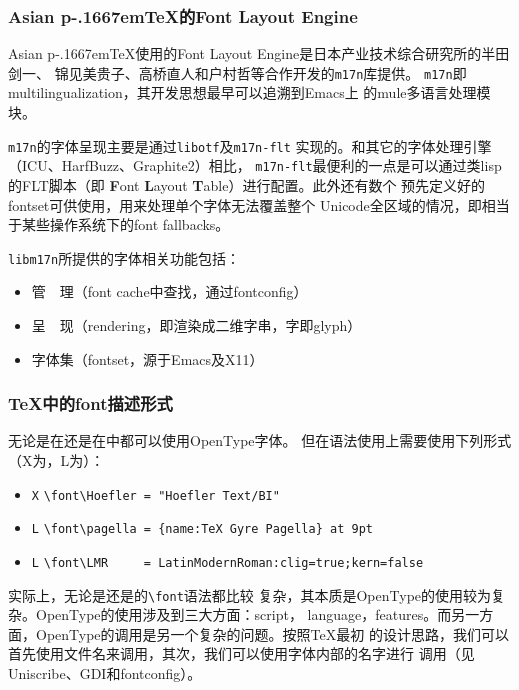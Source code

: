 \documentclass[dvipdfmx]{beamer}
\newcommand{\pTeX}{p\kern-.1667em\TeX}
\newcommand{\ptexng}{Asian \pTeX}
\begin{document}
%
%
%
%
\begin{frame}[fragile]
\frametitle{\ptexng 的Font Layout Engine}
\ptexng 使用的Font Layout Engine是日本产业技术综合研究所的半田剑一、
锦见美贵子、高桥直人和户村哲等合作开发的\texttt{m17n}库提供。
\texttt{m17n}即multilingualization，其开发思想最早可以追溯到Emacs上
的mule多语言处理模块。

\texttt{m17n}的字体呈现主要是通过\texttt{libotf}及\texttt{m17n-flt}
实现的。和其它的字体处理引擎（ICU、HarfBuzz、Graphite2）相比，
\texttt{m17n-flt}最便利的一点是可以通过类lisp的FLT脚本（即
{\bf F}ont {\bf L}ayout {\bf T}able）进行配置。此外还有数个
预先定义好的fontset可供使用，用来处理单个字体无法覆盖整个
Unicode全区域的情况，即相当于某些操作系统下的font fallbacks。

\texttt{libm17n}所提供的字体相关功能包括：

\begin{itemize}
\item 管　理（font cache中查找，通过fontconfig）
\item 呈　现（rendering，即渲染成二维字串，字即glyph）
\item 字体集（fontset，源于Emacs及X11）
\end{itemize}
\end{frame}
%
\begin{frame}[fragile]
\frametitle{\TeX 中的font描述形式}
无论是在还是在中都可以使用OpenType字体。
但在语法使用上需要使用下列形式（X为，L为）：
\begin{itemize}
\item \texttt{X} \verb!\font\Hoefler = "Hoefler Text/BI"!
\item \texttt{L} \verb!\font\pagella = {name:TeX Gyre Pagella} at 9pt!
\item \texttt{L} \verb!\font\LMR     = LatinModernRoman:clig=true;kern=false!
\end{itemize}

实际上，无论是还是的\verb!\font!语法都比较
复杂，其本质是OpenType的使用较为复杂。OpenType的使用涉及到三大方面：script，
language，features。而另一方面，OpenType的调用是另一个复杂的问题。按照\TeX 最初
的设计思路，我们可以首先使用文件名来调用，其次，我们可以使用字体内部的名字进行
调用（见Uniscribe、GDI和fontconfig）。
\end{frame}
\end{document}
